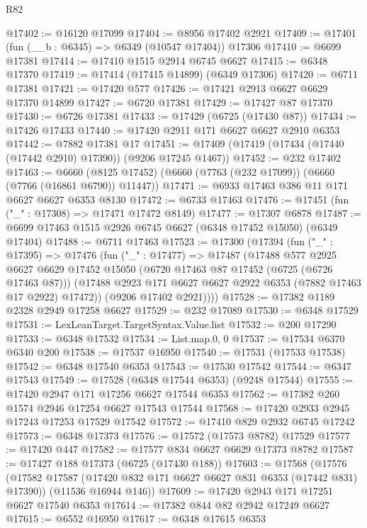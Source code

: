 \begin{lexlean}{R82}
\begin{coremodule}
@17402 := @16120 @17099
@17404 := @8956 @17402 @2921
@17409 := @17401 (fun (__b : @6345) => @6349 (@10547 @17404)) @17306
@17410 := @6699 @17381
@17414 := @17410 @1515 @2914 @6745 @6627
@17415 := @6348 @17370
@17419 := @17414 (@17415 @14899) (@6349 @17306)
@17420 := @6711 @17381
@17421 := @17420 @577
@17426 := @17421 @2913 @6627 @6629 @17370 @14899
@17427 := @6720 @17381
@17429 := @17427 @87 @17370
@17430 := @6726 @17381
@17433 := @17429 (@6725 (@17430 @87))
@17434 := @17426 @17433
@17440 := @17420 @2911 @171 @6627 @6627 @2910 @6353
@17442 := @7882 @17381 @17
@17451 := @17409 (@17419 (@17434 (@17440 (@17442 @2910) @17390)) (@9206 @17245 @1467))
@17452 := @232 @17402
@17463 := @6660 (@8125 @17452) (@6660 (@7763 (@232 @17099)) (@6660 (@7766 (@16861 @6790)) @11447))
@17471 := @6933 @17463 @386 @11 @171 @6627 @6627 @6353 @8130
@17472 := @6733 @17463
@17476 := @17451 (fun ("_" : @17308) => @17471 @17472 @8149)
@17477 := @17307 @6878
@17487 := @6699 @17463 @1515 @2926 @6745 @6627 (@6348 @17452 @15050) (@6349 @17404)
@17488 := @6711 @17463
@17523 := @17300
    (@17394
      (fun ("_" : @17395) =>
      @17476
        (fun ("_" : @17477) =>
        @17487
          (@17488
            @577
            @2925
            @6627
            @6629
            @17452
            @15050
            (@6720 @17463 @87 @17452 (@6725 (@6726 @17463 @87)))
            (@17488 @2923 @171 @6627 @6627 @2922 @6353 (@7882 @17463 @17 @2922) @17472))
          (@9206 @17402 @2921))))
@17528 := @17382 @1189 @2328 @2949 @17258 @6627
@17529 := @232 @17089
@17530 := @6348 @17529
@17531 := LexLeanTarget.TargetSyntax.Value.list
@17532 := @200 @17290
@17533 := @6348 @17532
@17534 := List.map.{0, 0}
@17537 := @17534 @6370 @6340 @200
@17538 := @17537 @16950
@17540 := @17531 (@17533 @17538)
@17542 := @6348 @17540 @6353
@17543 := @17530 @17542
@17544 := @6347 @17543
@17549 := @17528 (@6348 @17544 @6353) (@9248 @17544)
@17555 := @17420 @2947 @171 @17256 @6627 @17544 @6353
@17562 := @17382 @260 @1574 @2946 @17254 @6627 @17543 @17544
@17568 := @17420 @2933 @2945 @17243 @17253 @17529 @17542
@17572 := @17410 @829 @2932 @6745 @17242
@17573 := @6348 @17373
@17576 := @17572 (@17573 @8782) @17529
@17577 := @17420 @447
@17582 := @17577 @834 @6627 @6629 @17373 @8782
@17587 := @17427 @188 @17373 (@6725 (@17430 @188))
@17603 := @17568
    (@17576
      (@17582 @17587 (@17420 @832 @171 @6627 @6627 @831 @6353 (@17442 @831) @17390))
      (@11536 @16944 @146))
@17609 := @17420 @2943 @171 @17251 @6627 @17540 @6353
@17614 := @17382 @844 @82 @2942 @17249 @6627
@17615 := @6552 @16950
@17617 := @6348 @17615 @6353

\end{coremodule}
\end{lexlean}
